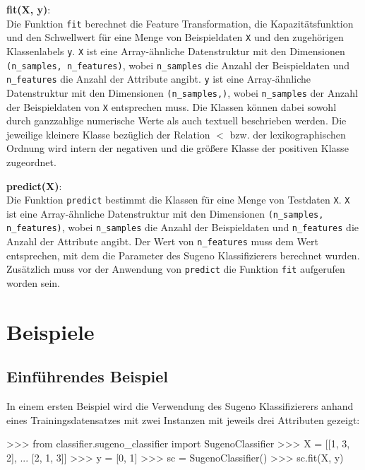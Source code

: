 \documentclass[12pt, a4paper]{article}
\begin{document}
\textbf{fit(X, y)}: \\
Die Funktion \texttt{fit} berechnet die Feature Transformation, die Kapazitätsfunktion und den Schwellwert für eine Menge von Beispieldaten \texttt{X} und den zugehörigen Klassenlabels \texttt{y}. \texttt{X} ist eine Array-ähnliche Datenstruktur mit den Dimensionen \texttt{(n\_samples, n\_features)}, wobei \texttt{n\_samples} die Anzahl der Beispieldaten und \texttt{n\_features} die Anzahl der Attribute angibt. \texttt{y} ist eine Array-ähnliche Datenstruktur mit den Dimensionen \texttt{(n\_samples,)}, wobei \texttt{n\_samples} der Anzahl der Beispieldaten von \texttt{X} entsprechen muss. Die Klassen können dabei sowohl durch ganzzahlige numerische Werte als auch textuell beschrieben werden. Die jeweilige kleinere Klasse bezüglich der Relation $<$ bzw. der lexikographischen Ordnung wird intern der negativen und die größere Klasse der positiven Klasse zugeordnet.

\textbf{predict(X)}: \\
Die Funktion \texttt{predict} bestimmt die Klassen für eine Menge von Testdaten \texttt{X}. \texttt{X} ist eine Array-ähnliche Datenstruktur mit den Dimensionen \texttt{(n\_samples, n\_features)}, wobei \texttt{n\_samples} die Anzahl der Beispieldaten und \texttt{n\_features} die Anzahl der Attribute angibt. Der Wert von \texttt{n\_features} muss dem Wert entsprechen, mit dem die Parameter des Sugeno Klassifizierers berechnet wurden. Zusätzlich muss vor der Anwendung von \texttt{predict} die Funktion \texttt{fit} aufgerufen worden sein.

\section{Beispiele}
\label{sec:documentation:examples}

\subsection{Einführendes Beispiel}
In einem ersten Beispiel wird die Verwendung des Sugeno Klassifizierers anhand eines Trainingsdatensatzes mit zwei Instanzen mit jeweils drei Attributen gezeigt:

\begin{python}
>>> from classifier.sugeno_classifier import SugenoClassifier
>>> X = [[1, 3, 2],
...      [2, 1, 3]]
>>> y = [0, 1]
>>> sc = SugenoClassifier()
>>> sc.fit(X, y)

\end{python}
\end{document}
